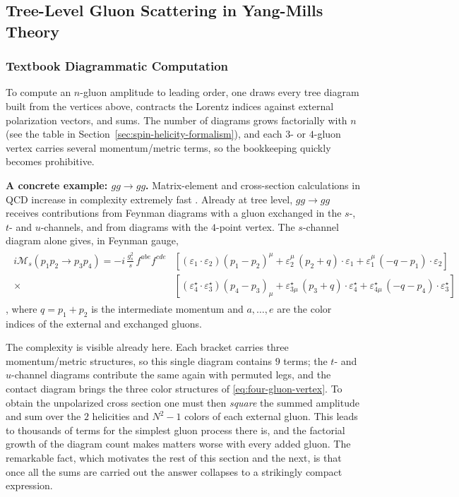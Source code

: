 \subsection{Tree-Level Gluon Scattering in Yang-Mills Theory}
\label{subsec:tree-level-gluon-scattering-in-yang-mills-theory}

\subsubsection{Textbook Diagrammatic Computation}
\label{subsubsec:textbook-diagrammatic-computation}

To compute an $n$-gluon amplitude to leading order, one draws every tree diagram built from the vertices above, contracts the Lorentz indices against external polarization vectors, and sums. The number of diagrams grows factorially with $n$ (see the table in Section~\ref{sec:spin-helicity-formalism}), and each $3$- or $4$-gluon vertex carries several momentum/metric terms, so the bookkeeping quickly becomes prohibitive.

\textbf{A concrete example: $gg \to gg$.} Matrix-element and cross-section calculations in QCD increase in complexity extremely fast \autocite[Chapter~27]{schwartzQFT2014}. Already at tree level, $gg \to gg$ receives contributions from Feynman diagrams with a gluon exchanged in the $s$-, $t$- and $u$-channels, and from diagrams with the $4$-point vertex. The $s$-channel diagram alone gives, in Feynman gauge,
\begin{align}
	\label{eq:gg-s-channel}
	\begin{split}
	i \mathcal{M}_s(p_1 p_2 \to p_3 p_4) = -i\, \frac{g_s^2}{s}\, f^{abe} f^{cde}
	&\left[ (\varepsilon_1 \cdot \varepsilon_2)(p_1 - p_2)^{\mu} + \varepsilon_2^{\mu}\, (p_2 + q) \cdot \varepsilon_1 + \varepsilon_1^{\mu}\, (-q - p_1) \cdot \varepsilon_2 \right] \\
	{}\times{}
	&\left[ (\varepsilon_4^{\star} \cdot \varepsilon_3^{\star})(p_4 - p_3)_{\mu} + \varepsilon_{3\mu}^{\star}\, (p_3 + q) \cdot \varepsilon_4^{\star} + \varepsilon_{4\mu}^{\star}\, (-q - p_4) \cdot \varepsilon_3^{\star} \right]
	\end{split}
\end{align}
\autocite[(27.1)]{schwartzQFT2014}, where $q = p_1 + p_2$ is the intermediate momentum and $a, \ldots, e$ are the color indices of the external and exchanged gluons.

The complexity is visible already here. Each bracket carries three momentum/metric structures, so this single diagram contains $9$ terms; the $t$- and $u$-channel diagrams contribute the same again with permuted legs, and the contact diagram brings the three color structures of \eqref{eq:four-gluon-vertex}. To obtain the unpolarized cross section one must then \emph{square} the summed amplitude and sum over the $2$ helicities and $N^2 - 1$ colors of each external gluon. This leads to thousands of terms for the simplest gluon process there is, and the factorial growth of the diagram count makes matters worse with every added gluon. The remarkable fact, which motivates the rest of this section and the next, is that once all the sums are carried out the answer collapses to a strikingly compact expression.

